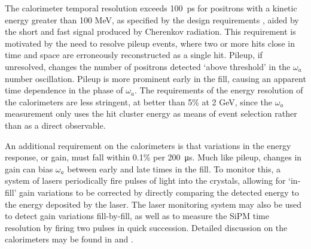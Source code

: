 

The calorimeter temporal resolution exceeds \SI{100}{\pico\second} for positrons with a kinetic energy greater than 100 MeV, as specified by the design requirements \cite{TDR}, aided by the short and fast signal produced by Cherenkov radiation. This requirement is motivated by the need to resolve pileup events, where two or more hits close in time and space are erroneously reconstructed as a single hit. Pileup, if unresolved, changes the number of positrons detected `above threshold' in the $\omega_{a}$ number oscillation. Pileup is more prominent early in the fill, causing an apparent time dependence in the phase of $\omega_{a}$. The requirements of the energy resolution of the calorimeters are less stringent, at better than 5\% at 2 GeV, since the $\omega_{a}$ measurement only uses the hit cluster energy as means of event selection rather than as a direct observable. 

An additional requirement on the calorimeters is that variations in the energy response, or gain, must fall within 0.1\% per \SI{200}{\micro\second}. Much like pileup, changes in gain can bias $\omega_{a}$ between early and late times in the fill. To monitor this, a system of lasers periodically fire pulses of light into the crystals, allowing for `in-fill' gain variations to be corrected by directly comparing the detected energy to the energy deposited by the laser. The laser monitoring system may also be used to detect gain variations fill-by-fill, as well as to measure the SiPM time resolution by firing two pulses in quick succession. Detailed discussion on the calorimeters may be found in \cite{TDR} and \cite{Hempstead}.

